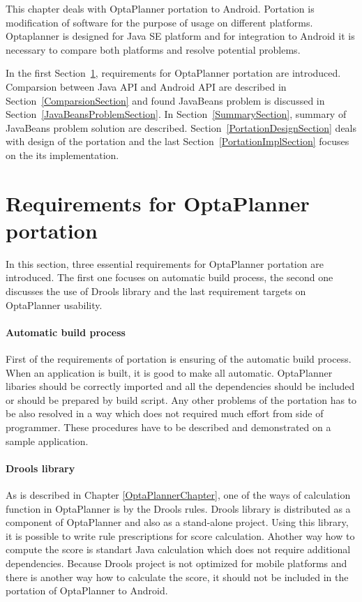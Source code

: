 This chapter deals with OptaPlanner portation to Android. Portation is modification of software for the purpose of usage
on different platforms. Optaplanner is designed for Java SE platform and for integration to Android it is necessary to
compare both platforms and resolve potential problems.

In the first Section~\ref{RequirementsPortationSection}, requirements for OptaPlanner portation are introduced.
Comparsion between Java API and Android API are described in Section~\ref{ComparsionSection} and found JavaBeans problem
is discussed in Section~\ref{JavaBeansProblemSection}. In Section~\ref{SummarySection}, summary of JavaBeans problem
solution are described. Section~\ref{PortationDesignSection} deals with design of the portation and the last
Section~\ref{PortationImplSection} focuses on the its implementation.

\section{Requirements for OptaPlanner portation}\label{RequirementsPortationSection}
In this section, three essential requirements for OptaPlanner portation are introduced. The first one focuses on
automatic build process, the second one discusses the use of Drools library and the last requirement targets on
OptaPlanner usability.

\paragraph{Automatic build process}
First of the requirements of portation is ensuring of the automatic build process. When an application is built, it is
good to make all automatic. OptaPlanner libaries should be correctly imported and all the dependencies should be
included or should be prepared by build script. Any other problems of the portation has to be also resolved in a way
which does not required much effort from side of programmer. These procedures have to be described and demonstrated
on a sample application.

\paragraph{Drools library}
As is described in Chapter \ref{OptaPlannerChapter}, one of the ways of calculation function in OptaPlanner is by the
Drools rules. Drools library is distributed as a component of OptaPlanner and also as a stand-alone project. Using this
library, it is possible to write rule prescriptions for score calculation. Ahother way how to compute the score is
standart Java calculation which does not require additional dependencies. Because Drools project is not optimized for
mobile platforms and there is another way how to calculate the score, it should not be included in the portation of
OptaPlanner to Android.

